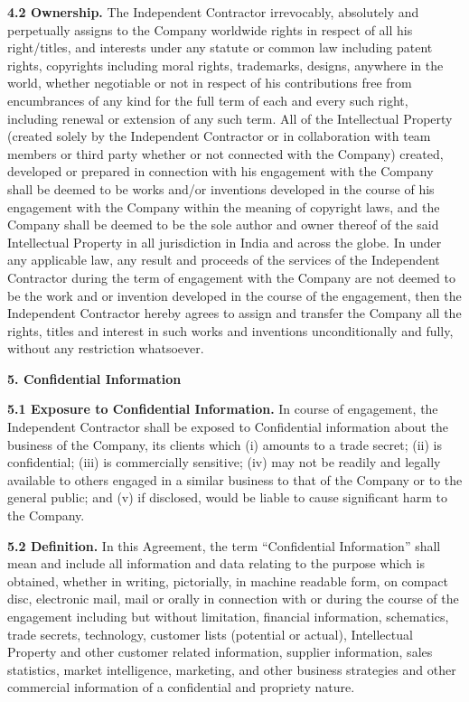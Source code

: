 \documentclass[12pt]{article}
\begin{document}
\vspace{0.5em}
\noindent
\textbf{4.2 Ownership.} The Independent Contractor irrevocably, absolutely and perpetually assigns to the Company worldwide rights in respect of all his right/titles, and interests under any statute or common law including patent rights, copyrights including moral rights, trademarks, designs, anywhere in the world, whether negotiable or not in respect of his contributions free from encumbrances of any kind for the full term of each and every such right, including renewal or extension of any such term.
\newline
All of the Intellectual Property (created solely by the Independent Contractor or in collaboration with team members or third party whether or not connected with the Company) created, developed or prepared in connection with his engagement with the Company shall be deemed to be works and/or inventions developed in the course of his engagement with the Company within the meaning of copyright laws, and the Company shall be deemed to be the sole author and owner thereof of the said Intellectual Property in all jurisdiction in India and across the globe.
\newline
In under any applicable law, any result and proceeds of the services of the Independent Contractor during the term of engagement with the Company are not deemed to be the work and or invention developed in the course of the engagement, then the Independent Contractor hereby agrees to assign and transfer the Company all the rights, titles and interest in such works and inventions unconditionally and fully, without any restriction whatsoever.

\vspace{1em}
\noindent
\textbf{5. Confidential Information}

\vspace{0.5em}
\noindent
\textbf{5.1 Exposure to Confidential Information.} In course of engagement, the Independent Contractor shall be exposed to Confidential information about the business of the Company, its clients which (i) amounts to a trade secret; (ii) is confidential; (iii) is commercially sensitive; (iv) may not be readily and legally available to others engaged in a similar business to that of the Company or to the general public; and (v) if disclosed, would be liable to cause significant harm to the Company.

\vspace{0.5em}
\noindent
\textbf{5.2 Definition.} In this Agreement, the term ``Confidential Information'' shall mean and include all information and data relating to the purpose which is obtained, whether in writing, pictorially, in machine readable form, on compact disc, electronic mail, mail or orally in connection with or during the course of the engagement including but without limitation, financial information, schematics, trade secrets, technology, customer lists (potential or actual), Intellectual Property and other customer related information, supplier information, sales statistics, market intelligence, marketing, and other business strategies and other commercial information of a confidential and propriety nature.
\end{document}
